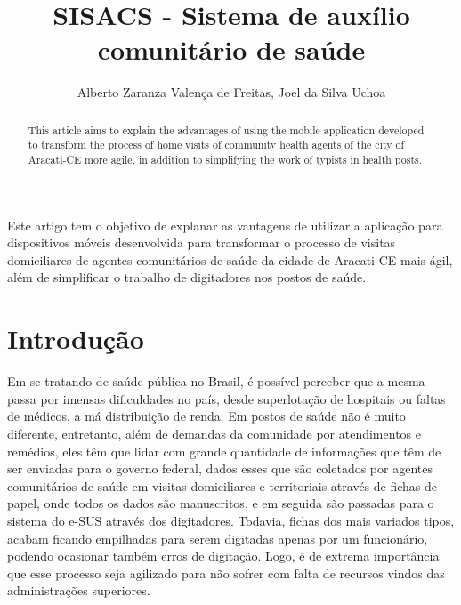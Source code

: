 \documentclass[12pt]{article}
\title{SISACS - Sistema de auxílio comunitário de saúde}
\author{Alberto Zaranza Valença de Freitas\inst{1}, Joel da Silva Uchoa\inst{1}}
\begin{document}
 

\maketitle

\begin{abstract}
  This article aims to explain the advantages of using the mobile application developed to transform the process of home visits of community health agents of the city of Aracati-CE more agile, in addition to simplifying the work of typists in health posts.
\end{abstract}
     
\begin{resumo} 
  Este artigo tem o objetivo de explanar as vantagens de utilizar a aplicação para dispositivos móveis desenvolvida para transformar o processo de visitas domiciliares de agentes comunitários de saúde da cidade de Aracati-CE mais ágil, além de simplificar o trabalho de digitadores nos postos de saúde.
\end{resumo}


\section{Introdução}

Em se tratando de saúde pública no Brasil, é possível perceber que a mesma passa por imensas dificuldades no país, desde superlotação de hospitais ou faltas de médicos, a má distribuição de renda. Em postos de saúde não é muito diferente, entretanto, além de demandas da comunidade por atendimentos e remédios, eles têm que lidar com grande quantidade de informações que têm de ser enviadas para o governo federal, dados esses que são coletados por agentes comunitários de saúde em visitas domiciliares e territoriais através de fichas de papel, onde todos os dados são manuscritos, e em seguida são passadas para o sistema do e-SUS através dos digitadores.
Todavia, fichas dos mais variados tipos, acabam ficando empilhadas para serem digitadas apenas por um funcionário, podendo ocasionar também erros de digitação.  Logo, é de extrema importância que esse processo seja agilizado para não sofrer com falta de recursos vindos das administrações superiores.
\end{document}
